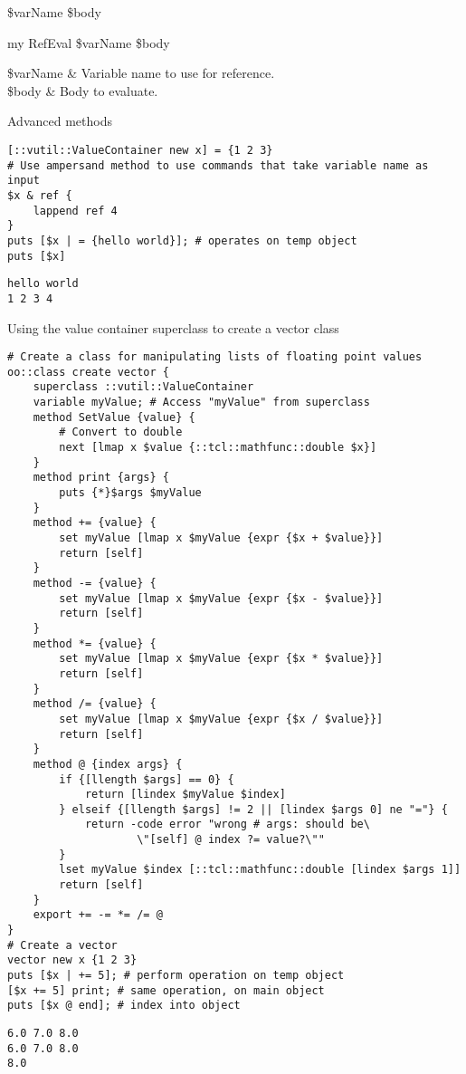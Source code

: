\documentclass{article}
\begin{document}
\begin{syntax}
 \$varName \$body
\end{syntax}
\begin{syntax}
my RefEval \$varName \$body
\end{syntax}
\begin{args}
\$varName & Variable name to use for reference. \\
\$body & Body to evaluate.
\end{args}
\begin{example}{Advanced methods}
\begin{lstlisting}
[::vutil::ValueContainer new x] = {1 2 3}
# Use ampersand method to use commands that take variable name as input
$x & ref {
    lappend ref 4
}
puts [$x | = {hello world}]; # operates on temp object
puts [$x]
\end{lstlisting}
\tcblower
\begin{lstlisting}
hello world
1 2 3 4
\end{lstlisting}
\end{example}

\clearpage
\begin{example}{Using the value container superclass to create a vector class}
\begin{lstlisting}
# Create a class for manipulating lists of floating point values
oo::class create vector {
    superclass ::vutil::ValueContainer
    variable myValue; # Access "myValue" from superclass
    method SetValue {value} {
        # Convert to double
        next [lmap x $value {::tcl::mathfunc::double $x}]
    }
    method print {args} {
        puts {*}$args $myValue
    }
    method += {value} {
        set myValue [lmap x $myValue {expr {$x + $value}}]
        return [self]
    }
    method -= {value} {
        set myValue [lmap x $myValue {expr {$x - $value}}]
        return [self]
    }
    method *= {value} {
        set myValue [lmap x $myValue {expr {$x * $value}}]
        return [self]
    }
    method /= {value} {
        set myValue [lmap x $myValue {expr {$x / $value}}]
        return [self]
    }
    method @ {index args} {
        if {[llength $args] == 0} {
            return [lindex $myValue $index]
        } elseif {[llength $args] != 2 || [lindex $args 0] ne "="} {
            return -code error "wrong # args: should be\
                    \"[self] @ index ?= value?\""
        }
        lset myValue $index [::tcl::mathfunc::double [lindex $args 1]]
        return [self]
    }
    export += -= *= /= @
}
# Create a vector
vector new x {1 2 3}
puts [$x | += 5]; # perform operation on temp object
[$x += 5] print; # same operation, on main object
puts [$x @ end]; # index into object
\end{lstlisting}
\tcblower
\begin{lstlisting}
6.0 7.0 8.0
6.0 7.0 8.0
8.0
\end{lstlisting}
\end{example}

\printindex
\end{document}
